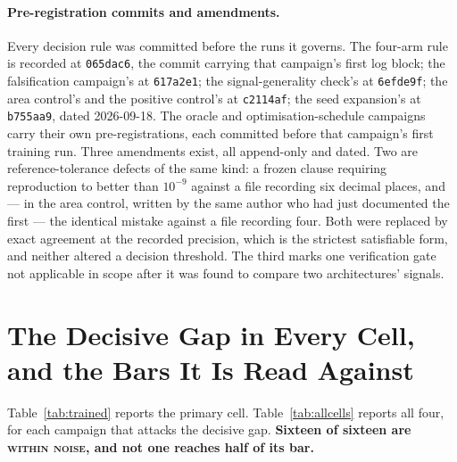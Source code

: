 \documentclass{article} %
\begin{document}
\paragraph{Pre-registration commits and amendments.} Every decision rule was committed before the
runs it governs. The four-arm rule is recorded at \texttt{065dac6}, the commit carrying that
campaign's first log block; the falsification campaign's at \texttt{617a2e1}; the signal-generality
check's at \texttt{6efde9f}; the area control's and the positive control's at \texttt{c2114af}; the
seed expansion's at \texttt{b755aa9}, dated 2026-09-18. The oracle and optimisation-schedule
campaigns carry their own pre-registrations, each committed before that campaign's first training
run. Three amendments exist, all append-only and dated. Two are reference-tolerance defects of the
same kind: a frozen clause requiring reproduction to better than $10^{-9}$ against a file recording
six decimal places, and --- in the area control, written by the same author who had just documented
the first --- the identical mistake against a file recording four. Both were replaced by exact
agreement at the recorded precision, which is the strictest satisfiable form, and neither altered a
decision threshold. The third marks one verification gate not applicable in scope after it was found
to compare two architectures' signals.

\section{The Decisive Gap in Every Cell, and the Bars It Is Read Against}
\label{app:diag}

Table~\ref{tab:trained} reports the primary cell. Table~\ref{tab:allcells} reports all four, for
each campaign that attacks the decisive gap. \textbf{Sixteen of sixteen are \textsc{within noise},
and not one reaches half of its bar.}
\end{document}
